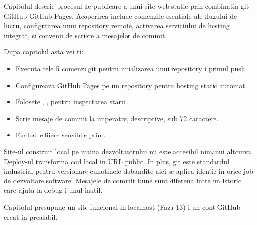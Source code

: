 \clearpage
{}
\setcounter{section}{0}
{}

Capitolul descrie procesul de publicare a unui site web static prin combinatia git \textendash{} GitHub \textendash{} GitHub Pages. Acoperirea include comenzile esentiale ale fluxului de lucru, configurarea unui repository remote, activarea serviciului de hosting integrat, si convenii de scriere a mesajelor de commit.

\bigskip

\begin{outcomes}
Dupa capitolul asta vei ti:
\begin{itemize}[itemsep=1pt]
  \item Executa cele 5 comenzi git pentru iniializarea unui repository i primul push.
  \item Configureaza GitHub Pages pe un repository pentru hosting static automat.
  \item Folosete , ,  pentru inspectarea starii.
  \item Scrie mesaje de commit la imperativ, descriptive, sub 72 caractere.
  \item Excludre fiiere sensibile prin .
\end{itemize}
\end{outcomes}

\begin{whymatters}
Site-ul construit local pe maina dezvoltatorului nu este accesibil nimanui altcuiva. Deploy-ul transforma cod local in URL public. In plus, git este standardul industrial pentru versionare \textendash{} cunotinele dobandite aici se aplica identic in orice job de dezvoltare software. Mesajele de commit bune sunt diferena intre un istoric care ajuta la debug i unul inutil.
\end{whymatters}

\begin{nota}
Capitolul presupune un site funcional in localhost (Faza 1\textendash{}3) i un cont GitHub creat in prealabil.
\end{nota}

